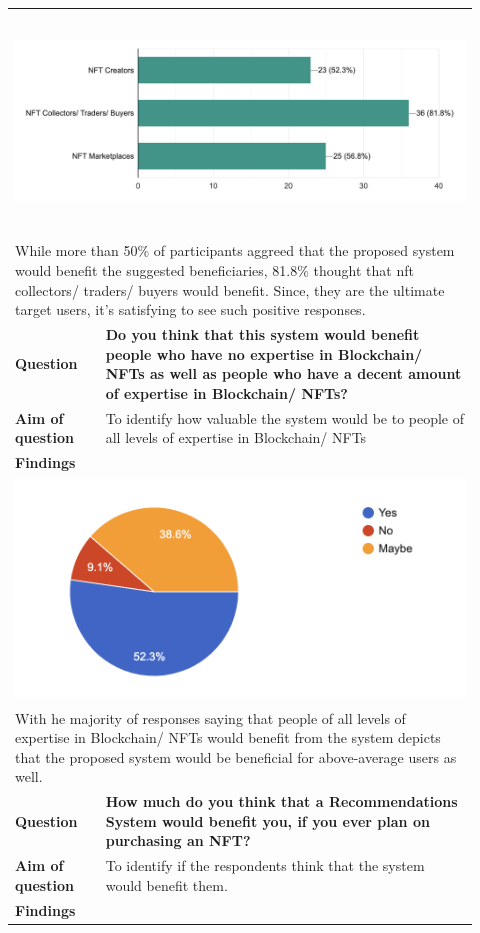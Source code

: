 \begin{longtable}{|p{0.18\linewidth}|p{0.74\linewidth}|}
\multicolumn{2}{|l|}{
\centering
\includegraphics[height=2.3in]{images/SRS/survey/survey-2.png}
} \\ 
\multicolumn{2}{|l|}{
\parbox{\textwidth}{
While more than 50\% of participants aggreed that the proposed system would benefit the suggested beneficiaries, 81.8\% thought that \gls{nft} collectors/ traders/ buyers would benefit. Since, they are the ultimate target users, it's satisfying to see such positive responses.
}} \\
\hline
\textbf{Question} & \textbf{Do you think that this system would benefit people who have no expertise in Blockchain/ NFTs as well as people who have a decent amount of expertise in Blockchain/ NFTs?} \\
\hline
\textbf{Aim of question} & To identify how valuable the system would be to people of all levels of expertise in Blockchain/ NFTs \\
\hline
\multicolumn{2}{|l|}{\textbf{Findings}} \\

\multicolumn{2}{|l|}{
\includegraphics[height=2.3in]{images/SRS/survey/survey-3.png}
} \\ 
\multicolumn{2}{|l|}{
\parbox{\textwidth}{
With he majority of responses saying that people of all levels of expertise in Blockchain/ NFTs would benefit from the system depicts that the proposed system would be beneficial for above-average users as well.
}} \\
\hline
\textbf{Question} & \textbf{How much do you think that a Recommendations System would benefit you, if you ever plan on purchasing an NFT?} \\
\hline
\textbf{Aim of question} & To identify if the respondents think that the system would benefit them. \\
\hline
\multicolumn{2}{|l|}{\textbf{Findings}} \\


\end{longtable}
